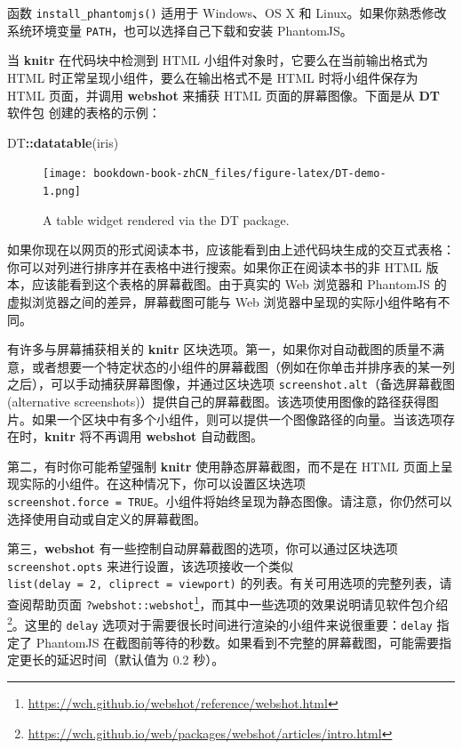 \documentclass[
  12pt,
]{krantz}
\newenvironment{Shaded}{\begin{snugshade}}{\end{snugshade}}
\newcommand{\FunctionTok}[1]{\textcolor[rgb]{0.13,0.29,0.53}{\textbf{#1}}}
\newcommand{\NormalTok}[1]{#1}
\newcommand{\SpecialCharTok}[1]{\textcolor[rgb]{0.81,0.36,0.00}{\textbf{#1}}}
\renewcommand{\href}[2]{#2\footnote{\url{#1}}}
\theoremstyle{definition}
\theoremstyle{definition}
\theoremstyle{definition}
\theoremstyle{definition}
\theoremstyle{remark}
\begin{document}
函数 \texttt{install\_phantomjs()} 适用于 Windows、OS X 和 Linux。如果你熟悉修改系统环境变量 \texttt{PATH}，也可以选择自己下载和安装 PhantomJS。

当 \textbf{knitr} 在代码块中检测到 HTML 小组件对象时，它要么在当前输出格式为 HTML 时正常呈现小组件，要么在输出格式不是 HTML 时将小组件保存为 HTML 页面，并调用 \textbf{webshot} 来捕获 HTML 页面的屏幕图像。下面是从 \textbf{DT} 软件包 \citep{R-DT} 创建的表格的示例：

\begin{Shaded}
\begin{Highlighting}[]
\NormalTok{DT}\SpecialCharTok{::}\FunctionTok{datatable}\NormalTok{(iris)}
\end{Highlighting}
\end{Shaded}

\begin{figure}
\centering
\texttt{[image: bookdown-book-zhCN\_files/figure-latex/DT-demo-1.png]}
\caption{\label{fig:DT-demo}A table widget rendered via the DT package.}
\end{figure}

如果你现在以网页的形式阅读本书，应该能看到由上述代码块生成的交互式表格：你可以对列进行排序并在表格中进行搜索。如果你正在阅读本书的非 HTML 版本，应该能看到这个表格的屏幕截图。由于真实的 Web 浏览器和 PhantomJS 的虚拟浏览器之间的差异，屏幕截图可能与 Web 浏览器中呈现的实际小组件略有不同。

有许多与屏幕捕获相关的 \textbf{knitr} 区块选项。第一，如果你对自动截图的质量不满意，或者想要一个特定状态的小组件的屏幕截图（例如在你单击并排序表的某一列之后），可以手动捕获屏幕图像，并通过区块选项 \texttt{screenshot.alt}（备选屏幕截图 (alternative screenshots)）提供自己的屏幕截图。该选项使用图像的路径获得图片。如果一个区块中有多个小组件，则可以提供一个图像路径的向量。当该选项存在时，\textbf{knitr} 将不再调用 \textbf{webshot} 自动截图。

第二，有时你可能希望强制 \textbf{knitr} 使用静态屏幕截图，而不是在 HTML 页面上呈现实际的小组件。在这种情况下，你可以设置区块选项 \texttt{screenshot.force\ =\ TRUE}。小组件将始终呈现为静态图像。请注意，你仍然可以选择使用自动或自定义的屏幕截图。

第三，\textbf{webshot} 有一些控制自动屏幕截图的选项，你可以通过区块选项 \texttt{screenshot.opts} 来进行设置，该选项接收一个类似 \texttt{list(delay\ =\ 2,\ cliprect\ =\ \textquotesingle{}viewport\textquotesingle{})} 的列表。有关可用选项的完整列表，请查阅帮助页面 \href{https://wch.github.io/webshot/reference/webshot.html}{\texttt{?webshot::webshot}}，而其中一些选项的效果说明请见\href{https://wch.github.io/web/packages/webshot/articles/intro.html}{软件包介绍}。这里的 \texttt{delay} 选项对于需要很长时间进行渲染的小组件来说很重要：\texttt{delay} 指定了 PhantomJS 在截图前等待的秒数。如果看到不完整的屏幕截图，可能需要指定更长的延迟时间（默认值为 0.2 秒）。
\end{document}
